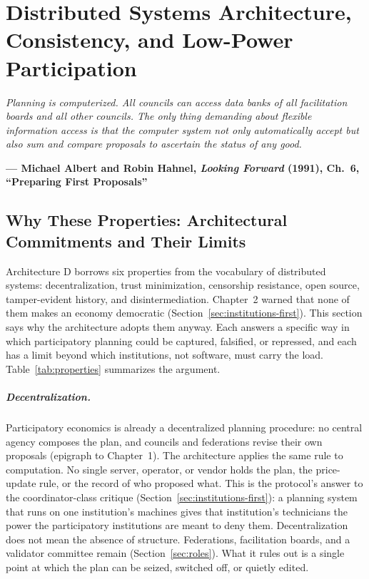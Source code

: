 \documentclass[10pt,twoside,openany]{book}
\theoremstyle{dpepstyle}
\newcommand{\chapterepigraph}[2]{%
  \vspace{-0.4em}
  \begin{FlushRight}
  \begin{minipage}{0.82\textwidth}
    \itshape\small\color{SlateDark} #1\par
    \vspace{3pt}
    \upshape\footnotesize\textbf{--- #2}
  \end{minipage}
  \end{FlushRight}
  \vspace{1em}
}
\newenvironment{FlushRight}{\begin{flushright}}{\end{flushright}}
\begin{document}
\chapter{Distributed Systems Architecture, Consistency, and Low-Power Participation}
\label{ch:architecture}

\chapterepigraph{Planning is computerized. All councils can access data banks of all facilitation boards and all other councils. The only thing demanding about flexible information access is that the computer system not only automatically accept but also sum and compare proposals to ascertain the status of any good.}{Michael Albert and Robin Hahnel, \emph{Looking Forward} (1991), Ch.~6, ``Preparing First Proposals''\protect\footnotemark}

\section{Why These Properties: Architectural Commitments and Their Limits}
\label{sec:why-properties}

Architecture D borrows six properties from the vocabulary of distributed systems: decentralization, trust minimization, censorship resistance, open source, tamper-evident history, and disintermediation. Chapter~2 warned that none of them makes an economy democratic (Section~\ref{sec:institutions-first}). This section says why the architecture adopts them anyway. Each answers a specific way in which participatory planning could be captured, falsified, or repressed, and each has a limit beyond which institutions, not software, must carry the load. Table~\ref{tab:properties} summarizes the argument.

\paragraph{Decentralization.} Participatory economics is already a decentralized planning procedure: no central agency composes the plan, and councils and federations revise their own proposals (epigraph to Chapter~1). The architecture applies the same rule to computation. No single server, operator, or vendor holds the plan, the price-update rule, or the record of who proposed what. This is the protocol's answer to the coordinator-class critique (Section~\ref{sec:institutions-first}): a planning system that runs on one institution's machines gives that institution's technicians the power the participatory institutions are meant to deny them. Decentralization does not mean the absence of structure. Federations, facilitation boards, and a validator committee remain (Section~\ref{sec:roles}). What it rules out is a single point at which the plan can be seized, switched off, or quietly edited.
\end{document}
